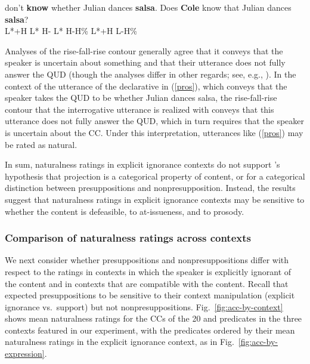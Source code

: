 \documentclass[11pt,fleqn]{article}
\newcommand{\6}{\mbox{$[\hspace*{-.6mm}[$}}
\newcommand{\9}{\mbox{$]\hspace*{-.6mm}]$}}
\newcommand{\citepos}[1]{\citeauthor{#1}'s \citeyear{#1}}
\begin{document}
\begin{exe}
\ex\label{pros}  don't {\bf know} whether Julian dances {\bf salsa}. Does {\bf Cole} know that Julian dances {\bf salsa}? 
\\ L*+H {} {L* H-} {} {} {} {L* H-H\%} {} L*+H {} {} {} {} {\hspace*{.2cm} L-H\%} \\ \glt 
\end{exe}
Analyses of the rise-fall-rise contour generally agree that it conveys that the speaker is uncertain about something and that their utterance does not fully answer the QUD (though the analyses differ in other regards; see, e.g., \citealt{ward-hirschberg85,buering97,buering03,wagner-etal2013}). In the context of the utterance of the declarative in (\ref{pros}), which conveys that the speaker takes the QUD to be whether Julian dances salsa, the rise-fall-rise contour that the interrogative utterance is realized with conveys that this utterance does not fully answer the QUD, which in turn requires that the speaker is uncertain about the CC. Under this interpretation, utterances like (\ref{pros}) may be rated as natural.

In sum, naturalness ratings in explicit ignorance contexts do not support \citepos{mandelkern-etal2020} hypothesis that projection is a categorical property of content, or for a categorical distinction between presuppositions and nonpresupposition. Instead, the results suggest that naturalness ratings in explicit ignorance contexts may be sensitive to whether the content is defeasible, to at-issueness, and to prosody.

\subsubsection{Comparison of naturalness ratings across contexts}\label{s:analysis2}

We next consider whether presuppositions and nonpresuppositions differ with respect to the ratings in contexts in which the speaker is explicitly ignorant of the content and in contexts that are compatible with the content. Recall that \citealt{mandelkern-etal2020} expected presuppositions to be sensitive to their context manipulation (explicit ignorance vs.\ support) but not nonpresuppositions. Fig.~\ref{fig:acc-by-context} shows mean naturalness ratings for the CCs of the 20  and  predicates in the three contexts featured in our experiment, with the predicates ordered by their mean naturalness ratings in the explicit ignorance context, as in Fig.~\ref{fig:acc-by-expression}. 
\end{document}
